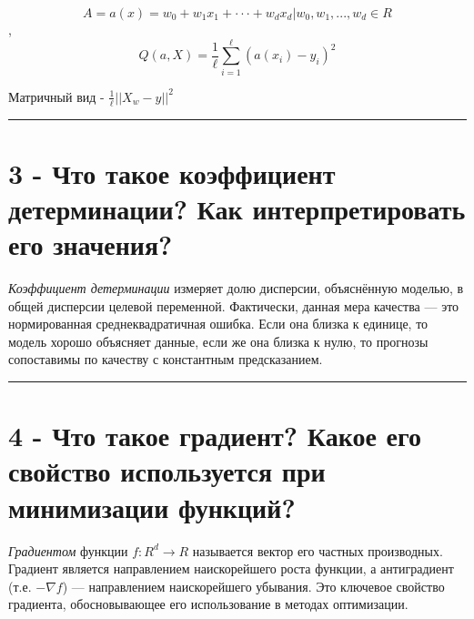 \documentclass[11pt]{article}
\begin{document}
\[A = {a(x) = w_0 + w_1x_1 + · · · + w_dx_d |w_0, w_1, . . . , w_d ∈ R}\],
\[Q(a, X) = \frac{1}{ℓ}\sum_{i=1}^ℓ(a(x_i) − y_i)^2\]

Матричный вид - \(\frac{1}{ℓ} ||X_w - y||^2\)

    \begin{center}\rule{0.5\linewidth}{\linethickness}\end{center}

    \section{3 - Что такое коэффициент детерминации? Как интерпретировать
его
значения?}\label{ux447ux442ux43e-ux442ux430ux43aux43eux435-ux43aux43eux44dux444ux444ux438ux446ux438ux435ux43dux442-ux434ux435ux442ux435ux440ux43cux438ux43dux430ux446ux438ux438-ux43aux430ux43a-ux438ux43dux442ux435ux440ux43fux440ux435ux442ux438ux440ux43eux432ux430ux442ux44c-ux435ux433ux43e-ux437ux43dux430ux447ux435ux43dux438ux44f}

\emph{Коэффициент детерминации} измеряет долю дисперсии, объяснённую
моделью, в общей дисперсии целевой переменной. Фактически, данная мера
качества --- это нормированная среднеквадратичная ошибка. Если она
близка к единице, то модель хорошо объясняет данные, если же она близка
к нулю, то прогнозы сопоставимы по качеству с константным предсказанием.

    \begin{center}\rule{0.5\linewidth}{\linethickness}\end{center}

    \section{4 - Что такое градиент? Какое его свойство используется при
минимизации
функций?}\label{ux447ux442ux43e-ux442ux430ux43aux43eux435-ux433ux440ux430ux434ux438ux435ux43dux442-ux43aux430ux43aux43eux435-ux435ux433ux43e-ux441ux432ux43eux439ux441ux442ux432ux43e-ux438ux441ux43fux43eux43bux44cux437ux443ux435ux442ux441ux44f-ux43fux440ux438-ux43cux438ux43dux438ux43cux438ux437ux430ux446ux438ux438-ux444ux443ux43dux43aux446ux438ux439}

\emph{Градиентом} функции \(f : R^{d} → R\) называется вектор его
частных производных. Градиент является направлением наискорейшего роста
функции, а антиградиент (т.е. \(−\nabla f\)) --- направлением
наискорейшего убывания. Это ключевое свойство градиента, обосновывающее
его использование в методах оптимизации.
\end{document}
